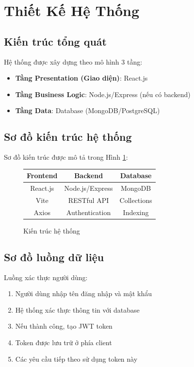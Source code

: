 \documentclass[12pt,a4paper]{report}
\begin{document}
\newpage

\section{Thiết Kế Hệ Thống}

\subsection{Kiến trúc tổng quát}

Hệ thống được xây dựng theo mô hình 3 tầng:

\begin{itemize}
    \item \textbf{Tầng Presentation (Giao diện)}: React.js
    \item \textbf{Tầng Business Logic}: Node.js/Express (nếu có backend)
    \item \textbf{Tầng Data}: Database (MongoDB/PostgreSQL)
\end{itemize}

\subsection{Sơ đồ kiến trúc hệ thống}

Sơ đồ kiến trúc được mô tả trong Hình \ref{fig:architecture}:

\begin{figure}[H]
    \centering
    \begin{tabular}{|c|c|c|}
        \hline
        \textbf{Frontend} & \textbf{Backend} & \textbf{Database} \\
        \hline
        React.js & Node.js/Express & MongoDB \\
        Vite & RESTful API & Collections \\
        Axios & Authentication & Indexing \\
        \hline
    \end{tabular}
    \caption{Kiến trúc hệ thống}
    \label{fig:architecture}
\end{figure}

\subsection{Sơ đồ luồng dữ liệu}

Luồng xác thực người dùng:
\begin{enumerate}
    \item Người dùng nhập tên đăng nhập và mật khẩu
    \item Hệ thống xác thực thông tin với database
    \item Nếu thành công, tạo JWT token
    \item Token được lưu trữ ở phía client
    \item Các yêu cầu tiếp theo sử dụng token này
\end{enumerate}
\end{document}
